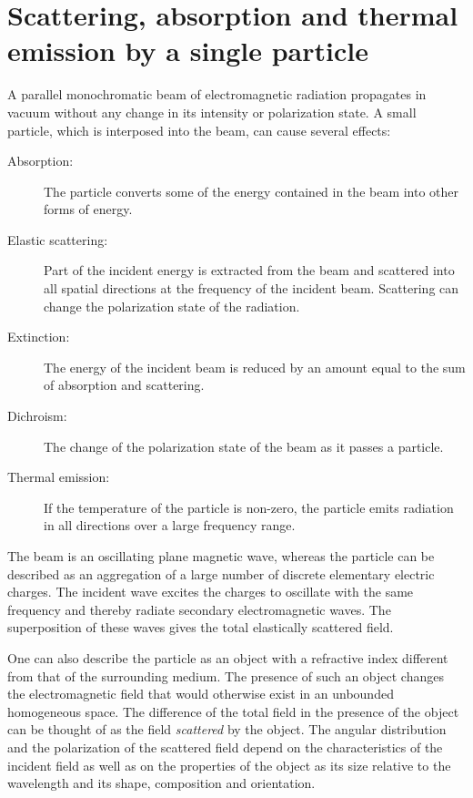 \section[Single particle scattering]{Scattering, absorption and thermal emission by a single particle}

A parallel monochromatic beam of electromagnetic radiation propagates
in vacuum without any change in its intensity or polarization state. A
small particle, which is interposed into the beam, can cause several
effects:
\begin{description}
\item[Absorption:] The particle converts some of the energy
  contained in the beam into other forms of energy.
\item[Elastic scattering:] Part of the incident energy is
  extracted from the beam and scattered into all spatial directions at
  the frequency of the incident beam. Scattering can change the
  polarization state of the radiation.
\item[Extinction:] The energy of the incident beam is reduced by
  an amount equal to the sum of absorption and scattering.
\item[Dichroism:] The change of the polarization state of the beam
  as it passes a particle.
\item[Thermal emission:] If the temperature of the particle is
  non-zero, the particle emits radiation in all directions over a
  large frequency range.
\end{description}
The beam is an oscillating plane magnetic wave, whereas the particle
can be described as an aggregation of a large number of discrete
elementary electric charges. The incident wave excites the charges to
oscillate with the same frequency and thereby radiate secondary
electromagnetic waves. The superposition of these waves gives the
total elastically scattered field.

One can also describe the particle as an object with a refractive
index different from that of the surrounding medium. The presence of
such an object changes the electromagnetic field that would otherwise
exist in an unbounded homogeneous space. The difference of the total
field in the presence of the object can be thought of as the field
\emph{scattered} by the object. The angular distribution and the
polarization of the scattered field depend on the characteristics of
the incident field as well as on the properties of the object as its
size relative to the wavelength and its shape, composition and
orientation.

